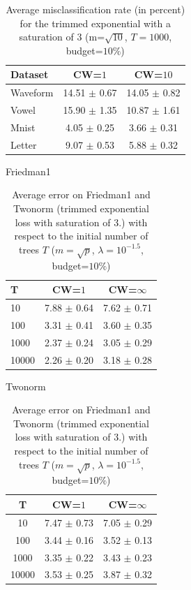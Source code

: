\documentclass{article}
\newcommand{\bestA}{\cellcolor{orange}}
\begin{document}
\begin{table}[t]
\caption{Average misclassification rate (in percent) for the trimmed 
exponential with a saturation of $3$ (m=$\sqrt{10}$, $T=1000$, budget=$10\%$)}
\label{tab:cwMulti}
\vskip 0.15in
\begin{center}
\begin{small}
\begin{sc}
\begin{tabular}{l|cc}
\hline
Dataset & CW=$1$ & CW=$10$ \\
\hline
Waveform & 14.51 $\pm$ 0.67 & \bestA 14.05 $\pm$ 0.82 \\
Vowel & 15.90 $\pm$ 1.35 & \bestA 10.87 $\pm$ 1.61 \\
Mnist & 4.05 $\pm$ 0.25 & \bestA 3.66 $\pm$ 0.31 \\
Letter & 9.07 $\pm$ 0.53 & \bestA 5.88 $\pm$ 0.32 \\
\hline
\end{tabular}
\end{sc}
\end{small}
\end{center}
\vskip -0.1in
\end{table}



\begin{table}[t]
\caption{Average error on Friedman1 and Twonorm (trimmed exponential loss with 
saturation of $3$.) with respect to the initial number of trees $T$
($m=\sqrt{p}$, $\lambda=10^{-1.5}$, budget=$10\%$)}
\label{tab:poolsizeError}
\vskip 0.15in
\begin{center}
\begin{small}
Friedman1\\
\begin{tabular}{l|cc}
\hline
T & CW=$1$ & CW=$\infty$ \\
\hline
10 & 7.88 $\pm$ 0.64 & 7.62 $\pm$ 0.71 \\
100 & 3.31 $\pm$ 0.41 & 3.60 $\pm$ 0.35 \\
1000 & 2.37 $\pm$ 0.24 & 3.05 $\pm$ 0.29 \\
10000 & 2.26 $\pm$ 0.20 & 3.18 $\pm$ 0.28 \\
\hline
\end{tabular}
\par
Twonorm \\
\begin{tabular}{c|cc}
\hline
T & CW=$1$ & CW=$\infty$ \\
\hline
10 & 7.47 $\pm$ 0.73 & 7.05 $\pm$ 0.29 \\
100 & 3.44 $\pm$ 0.16 & 3.52 $\pm$ 0.13 \\
1000 & 3.35 $\pm$ 0.22 & 3.43 $\pm$ 0.23 \\
10000 & 3.53 $\pm$ 0.25 & 3.87 $\pm$ 0.32 \\
\hline
\end{tabular}
\end{small}
\end{center}
\vskip -0.1in
\end{table}
\end{document}
